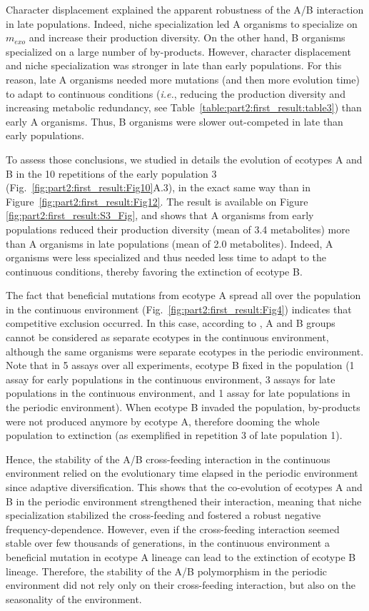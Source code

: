 Character displacement explained the apparent robustness of the A/B interaction in late populations. Indeed, niche specialization led A organisms to specialize on $m_{exo}$ and increase their production diversity. On the other hand, B organisms specialized on a large number of by-products.
However, character displacement and niche specialization was stronger in late than early populations. For this reason, late A organisms needed more mutations (and then more evolution time) to adapt to continuous conditions (\textit{i.e.}, reducing the production diversity and increasing metabolic redundancy, see Table~\ref{table:part2:first_result:table3}) than early A organisms.
Thus, B organisms were slower out-competed in late than early populations.

To assess those conclusions, we studied in details the evolution of ecotypes A and B in the 10 repetitions of the early population 3 (Fig.~\ref{fig:part2:first_result:Fig10}A.3), in the exact same way than in Figure~\ref{fig:part2:first_result:Fig12}. The result is available on Figure \ref{fig:part2:first_result:S3_Fig}, and shows that A organisms from early populations reduced their production diversity (mean of 3.4 metabolites) more than A organisms in late populations (mean of 2.0 metabolites). Indeed, A organisms were less specialized and thus needed less time to adapt to the continuous conditions, thereby favoring the extinction of ecotype B.

The fact that beneficial mutations from ecotype A spread all over the population in the continuous environment (Fig.~\ref{fig:part2:first_result:Fig4}) indicates that competitive exclusion occurred. In this case, according to \citep{cohan-2002}, A and B groups cannot be considered as separate ecotypes in the continuous environment, although the same organisms were separate ecotypes in the periodic environment.
Note that in 5 assays over all experiments, ecotype B fixed in the population (1 assay for early populations in the continuous environment, 3 assays for late populations in the continuous environment, and 1 assay for late populations in the periodic environment). When ecotype B invaded the population, by-products were not produced anymore by ecotype A, therefore dooming the whole population to extinction (as exemplified in repetition 3 of late population 1).

Hence, the stability of the A/B cross-feeding interaction in the continuous environment relied on the evolutionary time elapsed in the periodic environment since adaptive diversification. This shows that the co-evolution of ecotypes A and B in the periodic environment strengthened their interaction, meaning that niche specialization stabilized the cross-feeding and fostered a robust negative frequency-dependence.
However, even if the cross-feeding interaction seemed stable over few thousands of generations, in the continuous environment a beneficial mutation in ecotype A lineage can lead to the extinction of ecotype B lineage. Therefore, the stability of the A/B polymorphism in the periodic environment did not rely only on their cross-feeding interaction, but also on the seasonality of the environment.

